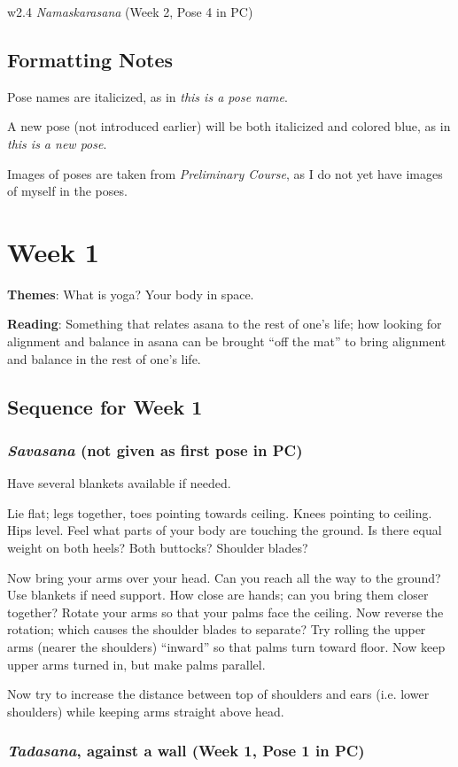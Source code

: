 \documentclass{book}
\newcommand{\apose}[1]{\emph{#1}}
\newcommand{\nam}{\apose{Namaskarasana}}
\newcommand{\sav}{\apose{Savasana}}
\newcommand{\tad}{\apose{Tadasana}}
\newcommand{\PC}[2]{{\normalfont\normalsize \hfill(Week #1, Pose #2 in PC)}}
\newcommand{\posenote}[1]{{\normalfont\normalsize \hfill(#1)}}
\newcommand{\term}[1]{``{#1}''}
\newcommand{\newpose}[1]{{{#1}}}
\newcounter{week}
\newcounter{pose}
\newcommand{\week}[1]
{ \IfDecimal{#1}{\setcounter{week}{\integerpart}}{fooey}
  \setcounter{pose}{1}
  \chapter{Week {#1}}}
\newcommand{\pose}{\subsection}
\begin{document}
w2.4 \nam{} \PC{2}{4}

\section*{Formatting Notes}
\label{chap:formatting}


Pose names are italicized, as in \apose{this is a pose name}.

A new pose (not introduced earlier) will be both italicized and
colored blue, as in \newpose{\apose{this is a new pose}}.

Images of poses are taken from \emph{Preliminary Course}, as I do not
yet have images of myself in the poses.

\week{1}
\label{week:1}

\textbf{Themes}: What is yoga? Your body in space.

\textbf{Reading}: Something that relates asana to the rest of one's
life; how looking for alignment and balance in asana can be brought
``off the mat'' to bring alignment and balance in the rest of one's
life.

\section{Sequence for Week 1}
\label{seq:1}

\pose{\newpose{\sav{}} \posenote{not given as first pose in PC}}

Have several blankets available if needed.

Lie flat; legs together, toes pointing towards ceiling. Knees pointing
to ceiling. Hips level. Feel what parts of your body are touching the
ground. Is there equal weight on both heels? Both buttocks? Shoulder
blades?


Now bring your arms over your head. Can you reach all the way to the
ground? Use blankets if need support. How close are hands; can you
bring them closer together? Rotate your arms so that your palms face
the ceiling. Now reverse the rotation; which causes the shoulder
blades to separate? Try rolling the upper arms (nearer the shoulders)
\term{inward} so that palms turn toward floor. Now keep upper arms
turned in, but make palms parallel.

Now try to increase the distance between top of shoulders and ears
(i.e. lower shoulders) while keeping arms straight above head.

\pose{\newpose{\tad{}}, against a wall \PC{1}{1}}
\end{document}
